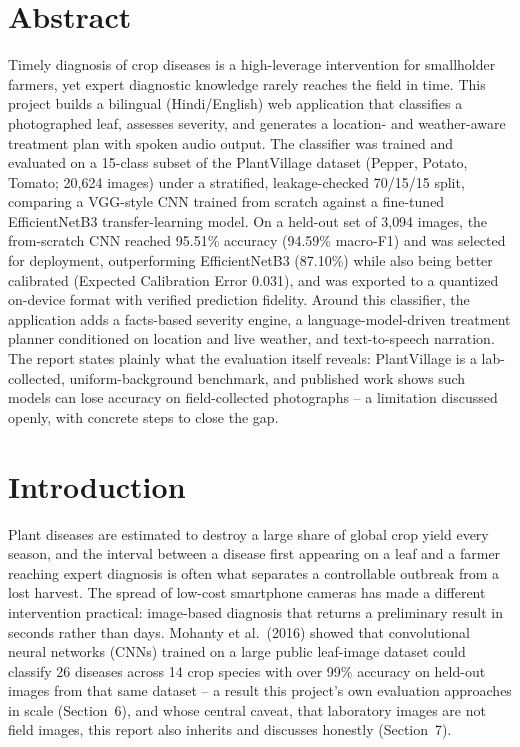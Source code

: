 \documentclass[12pt,a4paper]{article}
\begin{document}
\section{Abstract}
Timely diagnosis of crop diseases is a high-leverage intervention for
smallholder farmers, yet expert diagnostic knowledge rarely reaches the field
in time. This project builds a bilingual (Hindi/English) web
application that classifies a photographed leaf, assesses severity, and
generates a location- and weather-aware treatment plan with spoken audio
output. The classifier was trained and evaluated on a 15-class subset of the
PlantVillage dataset (Pepper, Potato, Tomato; 20{,}624 images) under a
stratified, leakage-checked 70/15/15 split, comparing a VGG-style CNN trained
from scratch against a fine-tuned EfficientNetB3 transfer-learning model. On
a held-out set of 3{,}094 images, the from-scratch CNN reached 95.51\%
accuracy (94.59\% macro-F1) and was selected for deployment, outperforming
EfficientNetB3 (87.10\%) while also being better calibrated (Expected
Calibration Error 0.031), and was exported to a quantized on-device format
with verified prediction fidelity. Around this classifier, the application
adds a facts-based severity engine, a language-model-driven treatment planner
conditioned on location and live weather, and text-to-speech narration. The
report states plainly what the evaluation itself reveals: PlantVillage is a
lab-collected, uniform-background benchmark, and published work shows such
models can lose accuracy on field-collected photographs -- a limitation
discussed openly, with concrete steps to close the gap.

\section{Introduction}
Plant diseases are estimated to destroy a large share of global crop yield
every season, and the interval between a disease first appearing on a leaf
and a farmer reaching expert diagnosis is often what separates a controllable
outbreak from a lost harvest. The spread of low-cost smartphone cameras has
made a different intervention practical: image-based diagnosis that returns a
preliminary result in seconds rather than days. Mohanty et al.\ (2016)
\cite{mohanty2016} showed that convolutional neural networks (CNNs) trained on
a large public leaf-image dataset could classify 26 diseases across 14 crop
species with over 99\% accuracy on held-out images from that same dataset --
a result this project's own evaluation approaches in scale (Section~6), and
whose central caveat, that laboratory images are not field images, this
report also inherits and discusses honestly (Section~7).
\end{document}
